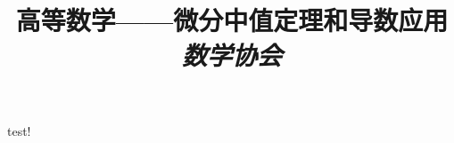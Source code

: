 \documentclass{article}
\title{\textbf{\small 高等数学——微分中值定理和导数应用 \\ \vspace{-5mm} \emph{数学协会}}}
\begin{document}
\maketitle
\thispagestyle{fancy}

test!
\end{document}

